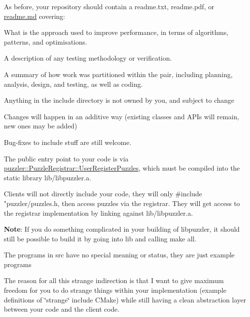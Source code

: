 \begin{DoxyItemize}
\item As before, your repository should contain a readme.\+txt, readme.\+pdf, or \hyperlink{a00140}{readme.\+md} covering\+:
\begin{DoxyItemize}
\item What is the approach used to improve performance, in terms of algorithms, patterns, and optimisations.
\item A description of any testing methodology or verification.
\item A summary of how work was partitioned within the pair, including planning, analysis, design, and testing, as well as coding.
\end{DoxyItemize}
\item Anything in the {\ttfamily include} directory is not owned by you, and subject to change
\begin{DoxyItemize}
\item Changes will happen in an additive way (existing classes and A\+P\+Is will remain, new ones may be added)
\item Bug-\/fixes to {\ttfamily include} stuff are still welcome.
\end{DoxyItemize}
\item The public entry point to your code is via {\ttfamily \hyperlink{a00028_a69b90f3718cbe855d87a1ea89a3ea3ac}{puzzler\+::\+Puzzle\+Registrar\+::\+User\+Register\+Puzzles}}, which must be compiled into the static library {\ttfamily lib/libpuzzler.\+a}.
\begin{DoxyItemize}
\item Clients will not directly include your code, they will only {\ttfamily \#include "puzzler/puzzles.\+h}, then access puzzles via the registrar. They will get access to the registrar implementation by linking against {\ttfamily lib/libpuzzler.\+a}.
\item {\bfseries Note}\+: If you do something complicated in your building of libpuzzler, it should still be possible to build it by going into {\ttfamily lib} and calling {\ttfamily make all}.
\end{DoxyItemize}
\item The programs in {\ttfamily src} have no special meaning or status, they are just example programs
\end{DoxyItemize}

The reason for all this strange indirection is that I want to give maximum freedom for you to do strange things within your implementation (example definitions of \char`\"{}strange\char`\"{} include C\+Make) while still having a clean abstraction layer between your code and the client code.


